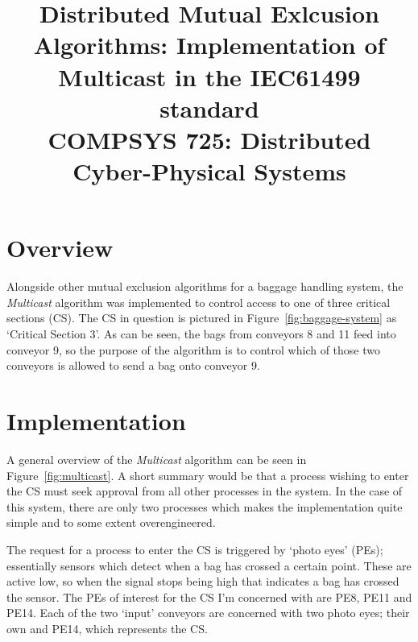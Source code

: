 \documentclass[12pt, conference]{IEEEtran}
\begin{document}
\title{Distributed Mutual Exlcusion Algorithms: Implementation of Multicast in
the IEC61499 standard\\
{\footnotesize COMPSYS 725: Distributed Cyber-Physical Systems}
}

\author{
}

\maketitle



\section{Overview}
Alongside other mutual exclusion algorithms for
a baggage handling system, the \textit{Multicast} algorithm was implemented to control
access to one of three critical sections (CS). The CS in question is
pictured in Figure~\ref{fig:baggage-system} as `Critical Section 3'. As can be
seen, the bags from conveyors 8 and 11 feed into conveyor 9, so the purpose of
the algorithm is to control which of those two conveyors is allowed to send
a bag onto conveyor 9. 
\section{Implementation}
A general overview of the \textit{Multicast} algorithm can be seen in
Figure~\ref{fig:multicast}. A short summary would be that a process wishing to
enter the CS must seek approval from all other processes in the
system. In the case of this system, there are only two processes which makes
the implementation quite simple and to some extent overengineered.

The request for a process to enter the CS is triggered by `photo
eyes' (PEs); essentially sensors which detect when a bag has crossed a certain point.
These are active low, so when the signal stops being high that indicates a bag
has crossed the sensor. The PEs of interest for the CS I'm
concerned with are PE8, PE11 and PE14. Each of the two `input' conveyors
are concerned with two photo eyes; their own and PE14, which represents the
CS.
\end{document}
